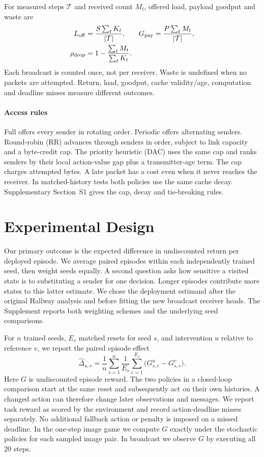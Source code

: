 \documentclass[a4paper,fleqn]{cas-dc}
\begin{document}
For measured steps $\mathcal T$ and received count $M_t$, offered load, payload goodput and waste are
\begin{equation}
\begin{aligned} L_{\rm off}&=\frac{S\sum_tK_t}{|\mathcal T|}, &G_{\rm pay}&=\frac{P\sum_tM_t}{|\mathcal T|},\\ \rho_{\rm drop}&=1-\frac{\sum_tM_t}{\sum_tK_t}.\end{aligned}
\end{equation}
Each broadcast is counted once, not per receiver. Waste is undefined when no packets are attempted. Return, load, goodput, cache validity/age, computation and deadline misses measure different outcomes.
\paragraph{Access rules}
Full offers every sender in rotating order. Periodic offers alternating senders. Round-robin (RR) advances through senders in order, subject to link capacity and a byte-credit cap. The priority heuristic (DAC) uses the same cap and ranks senders by their local action-value gap plus a transmitter-age term. The cap charges attempted bytes. A late packet has a cost even when it never reaches the receiver. In matched-history tests both policies use the same cache decay. Supplementary Section~S1 gives the cap, decay and tie-breaking rules.
\section{Experimental Design}
Our primary outcome is the expected difference in undiscounted return per deployed episode. We average paired episodes within each independently trained seed, then weight seeds equally. A second question asks how sensitive a visited state is to substituting a sender for one decision. Longer episodes contribute more states to this latter estimate. We chose the deployment estimand after the original Hallway analysis and before fitting the new broadcast receiver heads. The Supplement reports both weighting schemes and the underlying seed comparisons.

For $n$ trained seeds, $E_s$ matched resets for seed $s$, and intervention $u$ relative to reference $v$, we report the paired episode effect
\begin{equation}
 \widehat{\Delta}_{u,v}=\frac{1}{n}\sum_{s=1}^{n}\frac{1}{E_s}
       \sum_{e=1}^{E_s}\bigl(G_{s,e}^{u}-G_{s,e}^{v}\bigr).
 \label{eq:episode_effect}
\end{equation}
Here $G$ is undiscounted episode reward. The two policies in a closed-loop comparison start at the same reset and subsequently act on their own histories. A changed action can therefore change later observations and messages. We report task reward as scored by the environment and record action-deadline misses separately. No additional fallback action or penalty is imposed on a missed deadline. In the one-step image game we compute $G$ exactly under the stochastic policies for each sampled image pair. In broadcast we observe $G$ by executing all 20 steps.
\end{document}
